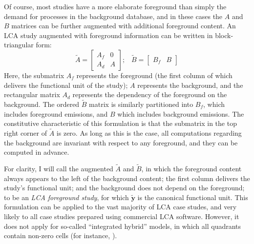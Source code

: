
Of course, most studies have a more elaborate foreground than simply the demand for processes in the background database, and in these cases the $A$ and $B$ matrices can be further augmented with additional foreground content.  An LCA study augmented with foreground information can be written in block-triangular form:
\begin{equation}
\tilde{A} = \left[\begin{array}{cc}
A_f & 0 \\
A_d &  A
  \end{array}
\right];\;\;\;
  \tilde{B} = \left[\begin{array}{cc} B_f & B   \end{array}\right]
\label{eqn:foreground}
\end{equation}
Here, the submatrix $A_f$ represents the foreground (the first column of which delivers the functional unit of the study); $A$ represents the background, and the rectangular matrix $A_d$ represents the dependency of the foreground on the background.  The ordered $\tilde{B}$ matrix is similarly partitioned into $B_f$, which includes foreground emissions, and $B$ which includes background emissions. The constitutive characteristic of this formulation is that the submatrix in the top right corner of $\tilde{A}$ is zero.  As long as this is the case, all computations regarding the background are invariant with respect to any foreground, and they can be computed in advance.

For clarity, I will call the augmented $\tilde{A}$ and $\tilde{B}$, in which the foreground content always appears to the left of the background content; the first column delivers the study's functional unit; and the background does not depend on the foreground; to be an \emph{LCA foreground study}, for which $\tilde{\mathbf{y}}$ is the canonical functional unit.  This formulation can be applied to the vast majority of LCA case studes, and very likely to all case studies prepared using commercial LCA software.  However, it does not apply for so-called ``integrated hybrid'' models, in which all quadrants contain non-zero cells (for instance, \cite{Gibon_2016}).


